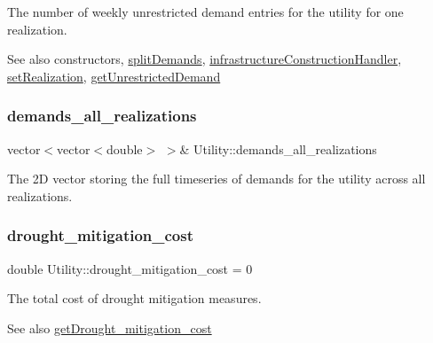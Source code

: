 The number of weekly unrestricted demand entries for the utility for one realization. 

\begin{DoxySeeAlso}{See also}
constructors, \mbox{\hyperlink{classUtility_aca42b14087c3184d4fec10a2e8729c05}{split\+Demands}}, \mbox{\hyperlink{classUtility_ae93114986578d3d3fbae56f271ac7df6}{infrastructure\+Construction\+Handler}}, \mbox{\hyperlink{classUtility_a2d41989b4154aed5c2fb99a27183ca34}{set\+Realization}}, \mbox{\hyperlink{classUtility_aa5fd345867aa8fb5c49d05110d51ca52}{get\+Unrestricted\+Demand}} 
\end{DoxySeeAlso}
\mbox{\label{classUtility_a8ffed6cb590d6f0855128828c3f289b8}} 
\subsubsection{\texorpdfstring{demands\+\_\+all\+\_\+realizations}{demands\_all\_realizations}}
{\footnotesize\ttfamily vector$<$vector$<$double$>$ $>$\& Utility\+::demands\+\_\+all\+\_\+realizations\hspace{0.3cm}{\ttfamily [private]}}



The 2D vector storing the full timeseries of demands for the utility across all realizations. 

\mbox{\label{classUtility_aec75cb2903dc25aa2743b9a8cf1271da}} 
\subsubsection{\texorpdfstring{drought\+\_\+mitigation\+\_\+cost}{drought\_mitigation\_cost}}
{\footnotesize\ttfamily double Utility\+::drought\+\_\+mitigation\+\_\+cost = 0\hspace{0.3cm}{\ttfamily [private]}}



The total cost of drought mitigation measures. 

\begin{DoxySeeAlso}{See also}
\mbox{\hyperlink{classUtility_a27dc0aeabdcb9fdb5a7d388e67e905f8}{get\+Drought\+\_\+mitigation\+\_\+cost}} 
\end{DoxySeeAlso}
\mbox{\label{classUtility_ae2dae3ed65967f89675218c3b55ef9f1}} 
